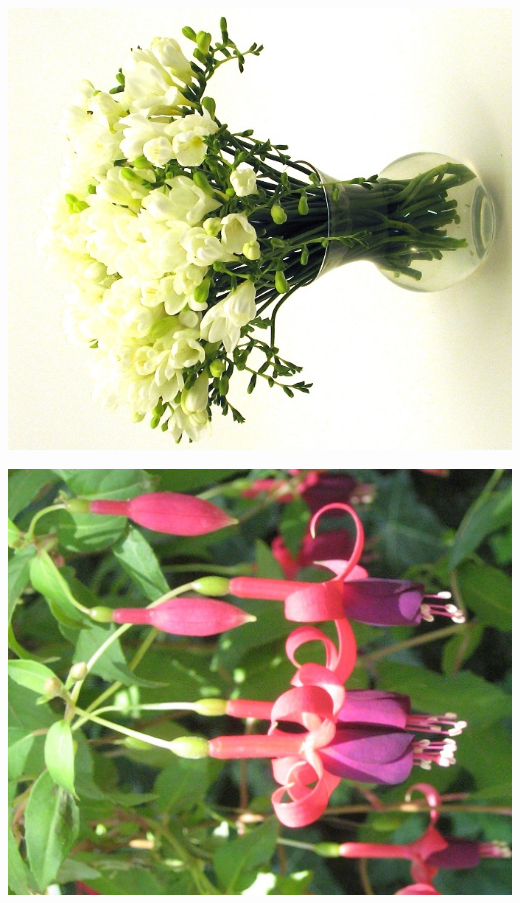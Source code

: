 \documentclass{article}
\begin{document}
\begin{center}
\includegraphics[height=0.925\paperheight]{../Freesia_white.jpg}
\end{center}
\newpage

\begin{center}
\includegraphics[height=0.925\paperheight]{../Fuchsia.jpg}
\end{center}
\newpage
\end{document}
